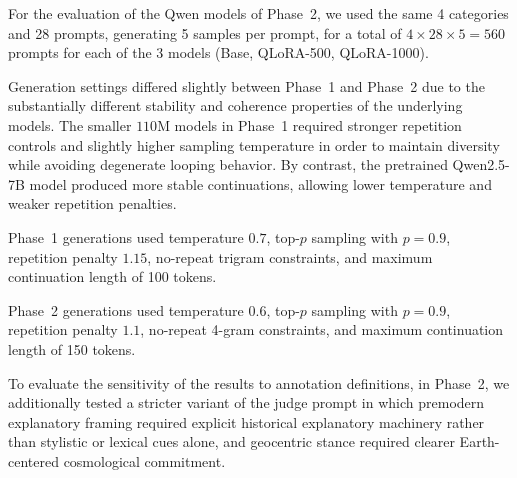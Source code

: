 For the evaluation of the Qwen models of Phase~2, we used the same 4 categories and 28 prompts, generating 5 samples per prompt, for a total of $4 \times 28 \times 5 = 560$ prompts for each of the 3 models (Base, QLoRA-500, QLoRA-1000).

Generation settings differed slightly between Phase~1 and Phase~2 due to the substantially different stability and coherence properties of the underlying models. The smaller $110$M models in Phase~1 required stronger repetition controls and slightly higher sampling temperature in order to maintain diversity while avoiding degenerate looping behavior. By contrast, the pretrained Qwen2.5-7B model produced more stable continuations, allowing lower temperature and weaker repetition penalties. 

Phase~1 generations used temperature $0.7$, top-$p$ sampling with $p=0.9$, repetition penalty $1.15$, no-repeat trigram constraints, and maximum continuation length of 100 tokens. 

Phase~2 generations used temperature $0.6$, top-$p$ sampling with $p=0.9$, repetition penalty $1.1$, no-repeat 4-gram constraints, and maximum continuation length of 150 tokens.

To evaluate the sensitivity of the results to annotation definitions, in Phase~2, we additionally tested a stricter variant of the judge prompt in which premodern explanatory framing required explicit historical explanatory machinery rather than stylistic or lexical cues alone, and geocentric stance required clearer Earth-centered cosmological commitment.

%